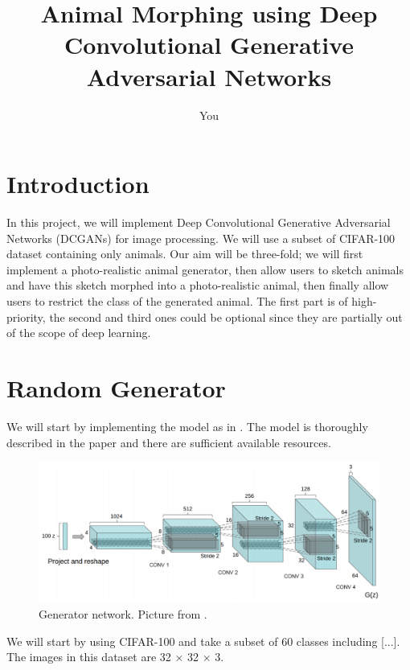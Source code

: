 \documentclass[a4paper]{article}
\title{Animal Morphing using Deep Convolutional Generative Adversarial Networks}
\author{
	You
}
\begin{document}
\maketitle


\section{Introduction}
In this project, we will implement Deep Convolutional Generative Adversarial Networks (DCGANs)  \cite{DBLP:journals/corr/RadfordMC15} for image processing. We will use a subset of CIFAR-100 dataset containing only animals. Our aim will be three-fold; we will first implement a photo-realistic animal generator, then allow users to sketch animals and have this sketch morphed into a photo-realistic animal, then finally allow users to restrict the class of the generated animal. The first part is of high-priority, the second and third ones could be optional since they are partially out of the scope of deep learning.


%
%
%
\section{Random Generator}
We will start by implementing the model as in \cite{DBLP:journals/corr/RadfordMC15}. The model is thoroughly described in the paper and there are sufficient available resources.

\begin{figure}[H]
	\includegraphics[width=\textwidth]{DCGAN.png}
	\caption{Generator network. Picture from \cite{DBLP:journals/corr/RadfordMC15}. }
\end{figure}

We will start by using CIFAR-100 and take a subset of 60 classes including [...]. The images in this dataset are 32 $\times$ 32 $\times$ 3.
\end{document}
